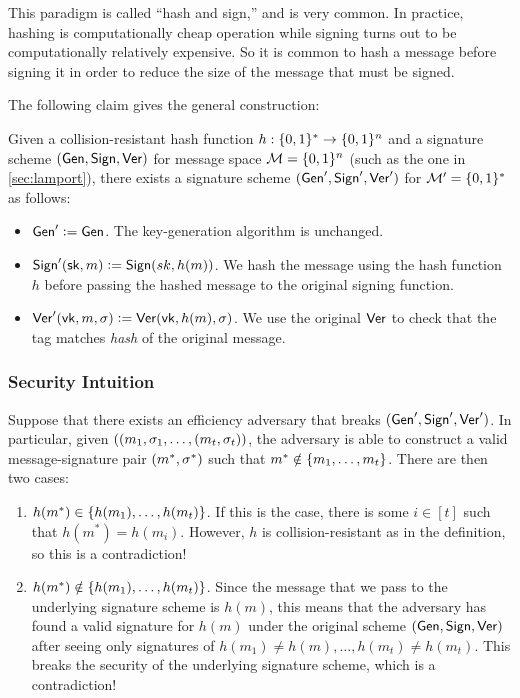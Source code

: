This paradigm is called ``hash and sign,'' and is very common.
In practice, hashing is computationally cheap operation while signing turns out to be computationally relatively expensive.
So it is common to hash a message before signing it in order to reduce the size of the message that must be signed. 

The following claim gives the general construction: 

\begin{claim}
Given a collision-resistant hash function $h: \{0,1\}^* \rightarrow \{0,1\}^{n}$ and a signature scheme $(\mathsf{Gen}, \mathsf{Sign}, \mathsf{Ver})$ for message space $\mathcal{M} = \{0,1\}^n$ (such as the one in \cref{sec:lamport}), there exists a signature scheme $(\mathsf{Gen}', \mathsf{Sign}', \mathsf{Ver}')$ for $\mathcal{M}' = \{0,1\}^*$ as follows:

\begin{itemize}
  \item $\mathsf{Gen}' \mathrel{\mathop:}= \mathsf{Gen}$. The key-generation algorithm is unchanged.
	\item $\mathsf{Sign}'({\mathsf{sk}}, m) \mathrel{\mathop:}= \mathsf{Sign}(sk, h(m))$. We hash the message using the hash function $h$ before passing the hashed message to the original signing function.
	\item $\mathsf{Ver}'(\mathsf{vk}, m, \sigma) \mathrel{\mathop:}= \mathsf{Ver}(\mathsf{vk}, h(m), \sigma)$. We use the original $\mathsf{Ver}$ to check that the tag matches \emph{hash} of the original message.
\end{itemize}
\end{claim}

\subsubsection{Security Intuition}
Suppose that there exists an efficiency adversary that breaks $(\mathsf{Gen}', \mathsf{Sign}', \mathsf{Ver}')$.
In particular, given $((m_1, \sigma_1, \ldots, (m_t, \sigma_t))$, the adversary is able to construct a valid
message-signature pair $(m^*, \sigma^*)$ such that $m^* \notin \left\{ m_1, \ldots, m_t \right\}$.
There are then two cases: 

\begin{enumerate}
	\item $h(m^*) \in \left\{ h(m_1), \ldots, h(m_t) \right\}$. If this is the case, there is some $i \in [t]$ such that $h(m^*) = h(m_i)$. However, $h$ is collision-resistant as in the definition, so this is a contradiction!
	\item $h(m^*) \notin \left\{ h(m_1), \ldots, h(m_t) \right\}$. Since the message that we pass to the underlying signature scheme is $h(m)$, this means that the adversary has found a valid signature for $h(m)$ under the original scheme $(\mathsf{Gen}, \mathsf{Sign}, \mathsf{Ver})$ after seeing only signatures of $h(m_1)\neq h(m), \ldots, h(m_t)\neq h(m_t)$. This breaks the security of the underlying signature scheme, which is a contradiction!
\end{enumerate}

